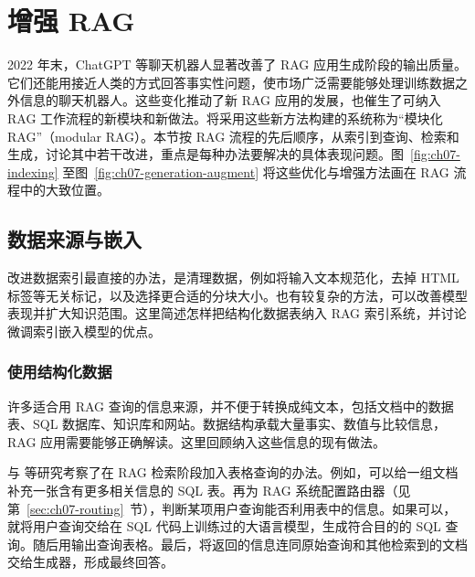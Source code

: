 \section{增强 RAG}
\label{sec:ch07-enhancing}
2022 年末，ChatGPT 等聊天机器人显著改善了 RAG 应用生成阶段的输出质量。它们还能用接近人类的方式回答事实性问题，使市场广泛需要能够处理训练数据之外信息的聊天机器人。这些变化推动了新 RAG 应用的发展，也催生了可纳入 RAG 工作流程的新模块和新做法。将采用这些新方法构建的系统称为“模块化 RAG”（modular RAG）。本节按 RAG 流程的先后顺序，从索引到查询、检索和生成，讨论其中若干改进，重点是每种办法要解决的具体表现问题。图~\ref{fig:ch07-indexing} 至图~\ref{fig:ch07-generation-augment} 将这些优化与增强方法画在 RAG 流程中的大致位置。

\subsection{数据来源与嵌入}
\begin{keypoint}
改进数据索引最直接的办法，是清理数据，例如将输入文本规范化，去掉 HTML 标签等无关标记，以及选择更合适的分块大小。也有较复杂的方法，可以改善模型表现并扩大知识范围。这里简述怎样把结构化数据表纳入 RAG 索引系统，并讨论微调索引嵌入模型的优点。
\end{keypoint}

\subsubsection{使用结构化数据}
\label{sec:ch07-structured}
许多适合用 RAG 查询的信息来源，并不便于转换成纯文本，包括文档中的数据表、SQL 数据库、知识库和网站。数据结构承载大量事实、数值与比较信息，RAG 应用需要能够正确解读。这里回顾纳入这些信息的现有做法。

与 等研究考察了在 RAG 检索阶段加入表格查询的办法。例如，可以给一组文档补充一张含有更多相关信息的 SQL 表。再为 RAG 系统配置路由器（见第~\ref{sec:ch07-routing}~节），判断某项用户查询能否利用表中的信息。如果可以，就将用户查询交给在 SQL 代码上训练过的大语言模型，生成符合目的的 SQL 查询。随后用输出查询表格。最后，将返回的信息连同原始查询和其他检索到的文档交给生成器，形成最终回答。


